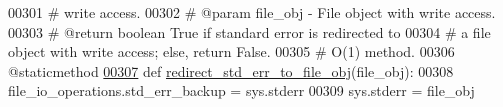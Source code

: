 \begin{DoxyCode}
00301     \textcolor{comment}{#       write access.}
00302     \textcolor{comment}{#   @param file\_obj - File object with write access.}
00303     \textcolor{comment}{#   @return boolean True if standard error is redirected to}
00304     \textcolor{comment}{#       a file object with write access; else, return False.}
00305     \textcolor{comment}{#   O(1) method.}
00306     @staticmethod
\hypertarget{file__io_8py_source_l00307}{}\hyperlink{classutilities_1_1file__io_1_1file__io__operations_a992b70cc7eeaafbe03fe5deb6a9f95d5}{00307}     \textcolor{keyword}{def }\hyperlink{classutilities_1_1file__io_1_1file__io__operations_a992b70cc7eeaafbe03fe5deb6a9f95d5}{redirect\_std\_err\_to\_file\_obj}(file\_obj):
00308         file\_io\_operations.std\_err\_backup = sys.stderr
00309         sys.stderr = file\_obj
\end{DoxyCode}
